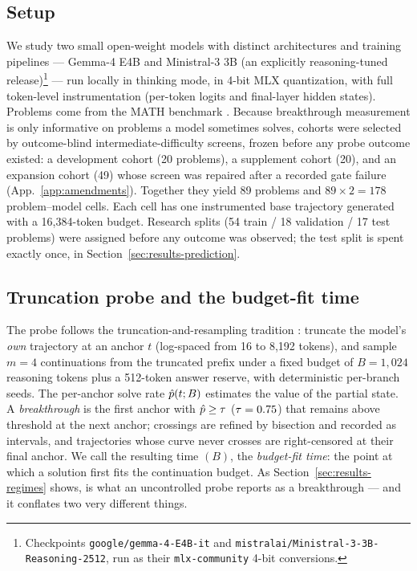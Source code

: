 
\subsection{Setup}

We study two small open-weight models with distinct architectures and
training pipelines --- Gemma-4 E4B and Ministral-3 3B (an explicitly
reasoning-tuned release)\footnote{\raggedright Checkpoints
\texttt{google/gemma-4-E4B-it} and
\texttt{mistralai/Ministral-3-3B-Reasoning-2512}, run as their
\texttt{mlx-community} 4-bit conversions.\par} --- run locally in thinking
mode, in 4-bit MLX quantization, with full
token-level instrumentation (per-token logits and final-layer hidden
states). Problems come from the MATH benchmark \citep{hendrycks2021math}.
Because breakthrough measurement is only informative on problems a model
sometimes solves, cohorts were selected by outcome-blind
intermediate-difficulty screens, frozen before any probe outcome existed: a
development cohort (20 problems), a supplement cohort (20), and an expansion
cohort (49) whose screen was repaired after a recorded gate failure
(App.~\ref{app:amendments}). Together they yield 89 problems and $89 \times
2 = 178$ problem--model cells. Each cell has one instrumented base
trajectory generated with a 16{,}384-token budget. Research splits (54
train / 18 validation / 17 test problems) were assigned before any outcome
was observed; the test split is spent exactly once, in
Section~\ref{sec:results-prediction}.

\subsection{Truncation probe and the budget-fit time \Tf}

The probe follows the truncation-and-resampling tradition
\citep{lanham2023,bogdan2025anchors}: truncate the model's \emph{own}
trajectory at an anchor $t$ (log-spaced from 16 to 8{,}192 tokens), and
sample $m=4$ continuations from the truncated prefix under a fixed budget
of $B = 1{,}024$ reasoning tokens plus a 512-token answer reserve, with
deterministic per-branch seeds. The per-anchor solve rate
$\hat{p}(t; B)$ estimates the value of the partial state. A
\emph{breakthrough} is the first anchor with $\hat{p} \ge \tau$
($\tau = 0.75$) that remains above threshold at the next anchor;
crossings are refined by bisection and recorded as intervals, and
trajectories whose curve never crosses are right-censored at their final
anchor. We call the resulting time \Tf$(B)$, the \emph{budget-fit time}:
the point at which a solution first fits the continuation budget. As
Section~\ref{sec:results-regimes} shows, \Tf{} is what an uncontrolled
probe reports as a breakthrough --- and it conflates two very different
things.

